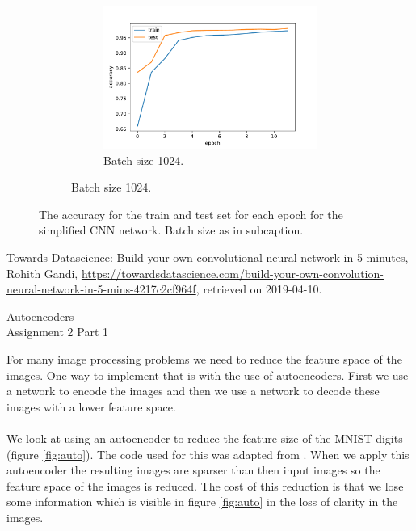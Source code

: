 \documentclass[10 pt, a4paper]{article}
\begin{document}
\begin{figure}[H]
\begin{subfigure}[b]{0.33\textwidth}
\begin{figure}[H]
\includegraphics[width=\textwidth]{AccCNN1024}
\caption{Batch size 1024.}
\label{fig:AccCNN1024}
\end{figure}
\end{subfigure}
\caption{The accuracy for the train and test set for each epoch for the simplified CNN network. Batch size as in subcaption.}
\label{fig:AccCNN}
\end{figure}

\vfill

\begin{thebibliography}{99}

Towards Datascience: Build your own convolutional neural network in 5 minutes, Rohith Gandi, \url{https://towardsdatascience.com/build-your-own-convolution-neural-network-in-5-mins-4217c2cf964f}, retrieved on 2019-04-10.

\end{thebibliography}

\newpage

\begin{center}
\huge Autoencoders \\
\Large Assignment 2 Part 1
\end{center}

\setcounter{figure}{0}

For many image processing problems we need to reduce the feature space of the images. One way to implement that is with the use of autoencoders. First we use a network to encode the images and then we use a network to decode these images with a lower feature space.
\\
\\
We look at using an autoencoder to reduce the feature size of the MNIST digits (figure \ref{fig:auto}). The code used for this was adapted from \cite{auto}. When we apply this autoencoder the resulting images are sparser than then input images so the feature space of the images is reduced. The cost of this reduction is that we lose some information which is visible in figure \ref{fig:auto} in the loss of clarity in the images.
\end{document}
